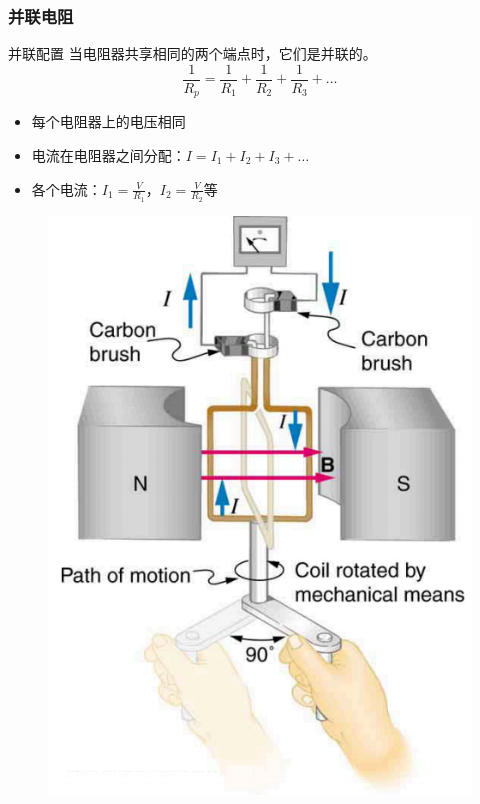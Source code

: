 \documentclass{beamer}
\begin{document}
\begin{frame}
    \frametitle{并联电阻}
    \begin{block}{并联配置}
        当电阻器共享相同的两个端点时，它们是并联的。
        \[ \frac{1}{R_p} = \frac{1}{R_1} + \frac{1}{R_2} + \frac{1}{R_3} + \ldots \]
    \end{block}
    \begin{itemize}
        \item 每个电阻器上的电压相同
        \item 电流在电阻器之间分配：$I = I_1 + I_2 + I_3 + \ldots$
        \item 各个电流：$I_1 = \frac{V}{R_1}$，$I_2 = \frac{V}{R_2}$等
    \end{itemize}
    \begin{center}
        \begin{figure}
            \centering
            \includegraphics[width=0.5\linewidth]{phys12-circuits-rc-circuit-diagram.png}
        \end{figure}
    \end{center}
\end{frame}
\end{document}
